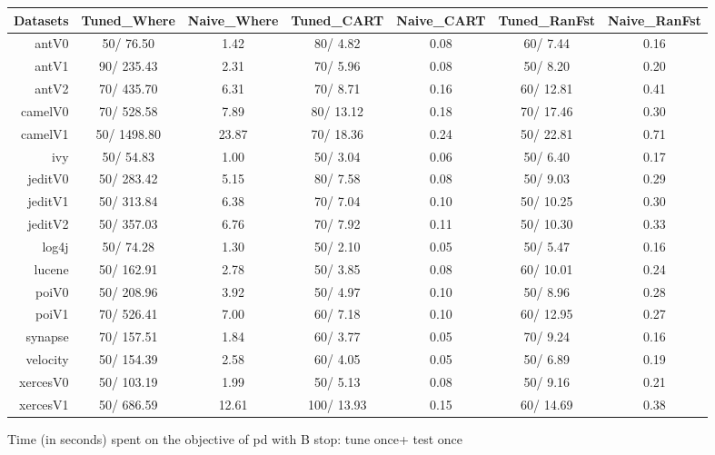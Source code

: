 \documentclass{acm_proc_article-sp}
\begin{document}
\clearpage
\begin{figure*}[!ht]
\scriptsize
\centering
  \begin{tabular}{r|c |c |c |c |c |c }
    \hline\hline
    Datasets & Tuned\_Where & Naive\_Where & Tuned\_CART & Naive\_CART & Tuned\_RanFst & Naive\_RanFst\\
    \hline
    antV0 & 50/ 76.50 & 1.42 & 80/ 4.82 & 0.08 & 60/ 7.44 & 0.16\\
    antV1 & 90/ 235.43 & 2.31 & 70/ 5.96 & 0.08 & 50/ 8.20 & 0.20\\
    antV2 & 70/ 435.70 & 6.31 & 70/ 8.71 & 0.16 & 60/ 12.81 & 0.41\\
    camelV0 & 70/ 528.58 & 7.89 & 80/ 13.12 & 0.18 & 70/ 17.46 & 0.30\\
    camelV1 & 50/ 1498.80 & 23.87 & 70/ 18.36 & 0.24 & 50/ 22.81 & 0.71\\
    ivy & 50/ 54.83 & 1.00 & 50/ 3.04 & 0.06 & 50/ 6.40 & 0.17\\
    jeditV0 & 50/ 283.42 & 5.15 & 80/ 7.58 & 0.08 & 50/ 9.03 & 0.29\\
    jeditV1 & 50/ 313.84 & 6.38 & 70/ 7.04 & 0.10 & 50/ 10.25 & 0.30\\
    jeditV2 & 50/ 357.03 & 6.76 & 70/ 7.92 & 0.11 & 50/ 10.30 & 0.33\\
    log4j & 50/ 74.28 & 1.30 & 50/ 2.10 & 0.05 & 50/ 5.47 & 0.16\\
    lucene & 50/ 162.91 & 2.78 & 50/ 3.85 & 0.08 & 60/ 10.01 & 0.24\\
    poiV0 & 50/ 208.96 & 3.92 & 50/ 4.97 & 0.10 & 50/ 8.96 & 0.28\\
    poiV1 & 70/ 526.41 & 7.00 & 60/ 7.18 & 0.10 & 60/ 12.95 & 0.27\\
    synapse & 70/ 157.51 & 1.84 & 60/ 3.77 & 0.05 & 70/ 9.24 & 0.16\\
    velocity & 50/ 154.39 & 2.58 & 60/ 4.05 & 0.05 & 50/ 6.89 & 0.19\\
    xercesV0 & 50/ 103.19 & 1.99 & 50/ 5.13 & 0.08 & 50/ 9.16 & 0.21\\
    xercesV1 & 50/ 686.59 & 12.61 & 100/ 13.93 & 0.15 & 60/ 14.69 & 0.38\\
  \end{tabular}
  \caption{Time (in seconds) spent on the objective of pd with B stop: tune once+ test once}
\end{figure*}
\end{document}
